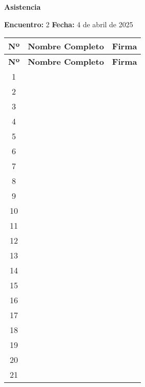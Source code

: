 \documentclass[12pt]{article}
\begin{document}
    \begin{center}
        \textbf{\Large Asistencia}
    \end{center}
    \textbf{Encuentro:} 2 \hfill \textbf{Fecha:} 4 de abril de 2025

    \begin{longtable}{|c|p{10cm}|p{5.5cm}|}
        \hline
        \textbf{Nº} & \textbf{Nombre Completo} & \textbf{Firma} \\
        \hline
        \endfirsthead
        \hline
        \textbf{Nº} & \textbf{Nombre Completo} & \textbf{Firma} \\
        \hline
        \endhead

        1 & \rule{0pt}{1.2cm} & \\
        \hline
        2 & \rule{0pt}{1.2cm} & \\
        \hline
        3 & \rule{0pt}{1.2cm} & \\
        \hline
        4 & \rule{0pt}{1.2cm} & \\
        \hline
        5 & \rule{0pt}{1.2cm} & \\
        \hline
        6 & \rule{0pt}{1.2cm} & \\
        \hline
        7 & \rule{0pt}{1.2cm} & \\
        \hline
        8 & \rule{0pt}{1.2cm} & \\
        \hline
        9 & \rule{0pt}{1.2cm} & \\
        \hline
        10 & \rule{0pt}{1.2cm} & \\
        \hline
        11 & \rule{0pt}{1.2cm} & \\
        \hline
        12 & \rule{0pt}{1.2cm} & \\
        \hline
        13 & \rule{0pt}{1.2cm} & \\
        \hline
        14 & \rule{0pt}{1.2cm} & \\
        \hline
        15 & \rule{0pt}{1.2cm} & \\
        \hline
        16 & \rule{0pt}{1.2cm} & \\
        \hline
        17 & \rule{0pt}{1.2cm} & \\
        \hline
        18 & \rule{0pt}{1.2cm} & \\
        \hline
        19 & \rule{0pt}{1.2cm} & \\
        \hline
        20 & \rule{0pt}{1.2cm} & \\
        \hline
        21 & \rule{0pt}{1.2cm} & \\
        \hline

\end{longtable}
\end{document}

